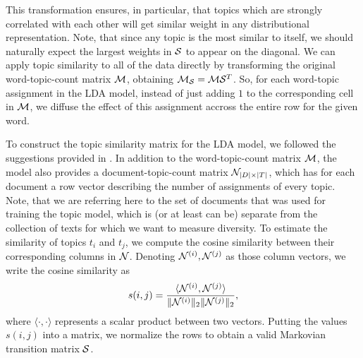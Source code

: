 This transformation ensures, in particular, that topics which are
strongly correlated with each other will get similar weight in any
distributional representation. Note, that since any topic is the most
similar to itself, we should naturally expect the largest weights in
${\mathcal S}$ to appear on the diagonal. We can apply topic similarity to all
of the data directly by transforming the original word-topic-count
matrix ${\mathcal M}$, obtaining ${\mathcal M}_{\mathcal S}={\mathcal M}{\mathcal S}^T$. So, for each word-topic
assignment in the LDA model, instead of just adding $1$ to the
corresponding cell in ${\mathcal M}$, we diffuse the effect of this assignment
accross the entire row for the given word.

To construct the topic similarity matrix for the LDA model, we
followed the suggestions provided in \cite{bache:2013}. In addition to
the word-topic-count matrix ${\mathcal M}$, the model also provides a
document-topic-count matrix ${\mathcal N}_{|D|\times|T|}$, which has for each
document a row vector describing the number of assignments of
every topic. Note, that we are referring here to the set of documents
that was used for training the topic model, which is (or at least can
be) separate from the collection of texts for which we want to measure
diversity. To estimate the similarity of topics $t_i$ and $t_j$, we
compute the cosine similarity between their corresponding columns in
${\mathcal N}$. Denoting ${\mathcal N}^{(i)},{\mathcal N}^{(j)}$ as those column vectors, we
write the cosine similarity as
\begin{align*}
s(i,j) = \frac{\langle{\mathcal N}^{(i)}, {\mathcal N}^{(j)}\rangle}{\|{\mathcal N}^{(i)}\|_2\|{\mathcal N}^{(j)}\|_2},
\end{align*}
where $\langle\cdot,\cdot\rangle$ represents a scalar product between
two vectors. Putting the values $s(i,j)$ into a matrix, we normalize
the rows to obtain a valid Markovian transition matrix ${\mathcal S}$.


